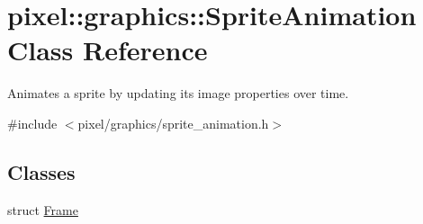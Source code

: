 \hypertarget{classpixel_1_1graphics_1_1_sprite_animation}{}\section{pixel\+:\+:graphics\+:\+:Sprite\+Animation Class Reference}
\label{classpixel_1_1graphics_1_1_sprite_animation}


Animates a sprite by updating its image properties over time.  




{\ttfamily \#include $<$pixel/graphics/sprite\+\_\+animation.\+h$>$}

\subsection*{Classes}
\begin{DoxyCompactItemize}
\item 
struct \hyperlink{structpixel_1_1graphics_1_1_sprite_animation_1_1_frame}{Frame}
\end{DoxyCompactItemize}
